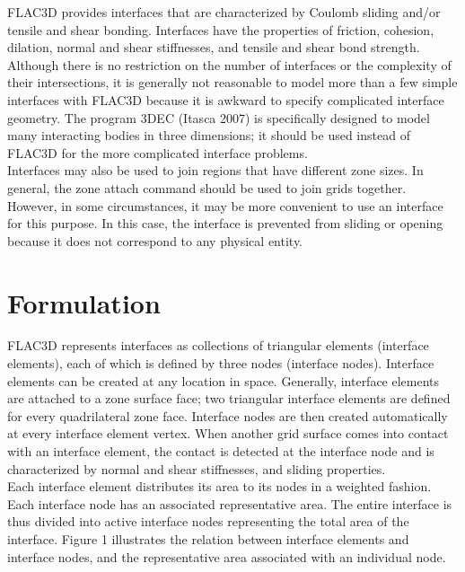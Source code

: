 \documentclass[a4paper, nobind]{templates/ociamthesis}
\begin{document}
FLAC3D provides interfaces that are characterized by Coulomb sliding and/or tensile and shear bonding. Interfaces have the properties of friction, cohesion, dilation, normal and shear stiffnesses, and tensile and shear bond strength. Although there is no restriction on the number of interfaces or the complexity of their intersections, it is generally not reasonable to model more than a few simple interfaces with FLAC3D because it is awkward to specify complicated interface geometry. The program 3DEC (Itasca 2007) is specifically designed to model many interacting bodies in three dimensions; it should be used instead of FLAC3D for the more complicated interface problems.\\

Interfaces may also be used to join regions that have different zone sizes. In general, the zone attach command should be used to join grids together. However, in some circumstances, it may be more convenient to use an interface for this purpose. In this case, the interface is prevented from sliding or opening because it does not correspond to any physical entity.

\hypertarget{formulation}{%
\section{Formulation}\label{formulation}}

FLAC3D represents interfaces as collections of triangular elements (interface elements), each of which is defined by three nodes (interface nodes). Interface elements can be created at any location in space. Generally, interface elements are attached to a zone surface face; two triangular interface elements are defined for every quadrilateral zone face. Interface nodes are then created automatically at every interface element vertex. When another grid surface comes into contact with an interface element, the contact is detected at the interface node and is characterized by normal and shear stiffnesses, and sliding properties.\\

Each interface element distributes its area to its nodes in a weighted fashion. Each interface node has an associated representative area. The entire interface is thus divided into active interface nodes representing the total area of the interface. Figure 1 illustrates the relation between interface elements and interface nodes, and the representative area associated with an individual node.\\
\end{document}
